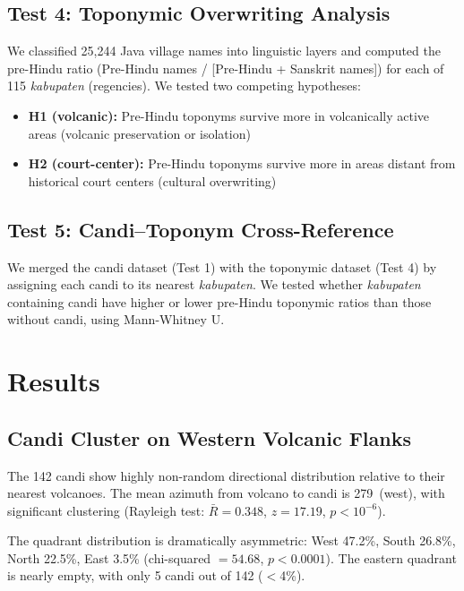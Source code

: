 \documentclass[12pt,a4paper]{article}
\begin{document}
\subsection{Test 4: Toponymic Overwriting Analysis}
\label{sec:toponymic}

We classified 25,244 Java village names into linguistic layers and computed the pre-Hindu ratio (Pre-Hindu names / [Pre-Hindu + Sanskrit names]) for each of 115 \emph{kabupaten} (regencies). We tested two competing hypotheses:
\begin{itemize}
    \item \textbf{H1 (volcanic):} Pre-Hindu toponyms survive more in volcanically active areas (volcanic preservation or isolation)
    \item \textbf{H2 (court-center):} Pre-Hindu toponyms survive more in areas distant from historical court centers (cultural overwriting)
\end{itemize}

\subsection{Test 5: Candi--Toponym Cross-Reference}
\label{sec:crossref}

We merged the candi dataset (Test 1) with the toponymic dataset (Test 4) by assigning each candi to its nearest \emph{kabupaten}. We tested whether \emph{kabupaten} containing candi have higher or lower pre-Hindu toponymic ratios than those without candi, using Mann-Whitney U.

\section{Results}

\subsection{Candi Cluster on Western Volcanic Flanks}

The 142 candi show highly non-random directional distribution relative to their nearest volcanoes. The mean azimuth from volcano to candi is 279\textdegree\ (west), with significant clustering (Rayleigh test: $\bar{R}=0.348$, $z=17.19$, $p<10^{-6}$).

The quadrant distribution is dramatically asymmetric: West 47.2\%, South 26.8\%, North 22.5\%, East 3.5\% (chi-squared $=54.68$, $p<0.0001$). The eastern quadrant is nearly empty, with only 5 candi out of 142 ($<$4\%).
\end{document}
